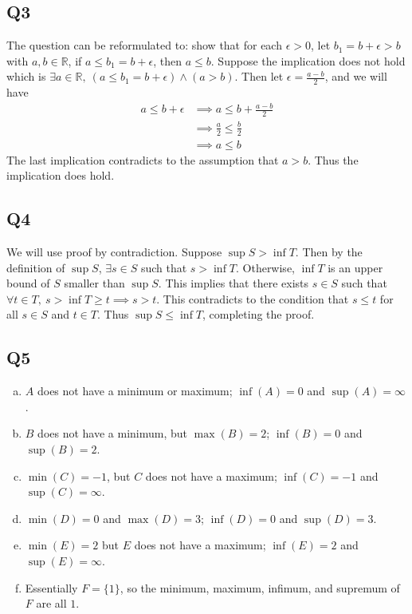 \documentclass[12pt,lettersize]{article}
\newcommand{\R}{\mathbb{R}}
\begin{document}
\subsection*{Q3}

The question can be reformulated to: show that for each $\epsilon>0$, let $b_1=b+\epsilon>b$ with $a,b\in\R$, if $a\leq b_1=b+\epsilon$, then $a\leq b$. Suppose the implication does not hold which is $\exists a\in\R,\ (a\leq b_1=b+\epsilon)\land(a>b)$. Then let $\epsilon=\frac{a-b}{2}$, and we will have
\begin{align*}
	 a\leq b+\epsilon &\implies a\leq b+\frac{a-b}{2}\\
	 				  &\implies \frac{a}{2} \leq \frac{b}{2}\\
	 				  &\implies a\leq b
\end{align*}
The last implication contradicts to the assumption that $a>b$. Thus the implication does hold. 
\newpage

\subsection*{Q4}

We will use proof by contradiction. Suppose $\sup S>\inf T$. Then by the definition of $\sup S$, $\exists s\in S$ such that $s>\inf T$. Otherwise, $\inf T$ is an upper bound of $S$ smaller than $\sup S$. This implies that there exists $s\in S$ such that $\forall t\in T,\ s>\inf T\geq t\implies s>t$. This contradicts to the condition that $s\leq t$ for all $s\in S$ and $t\in T$. Thus $\sup S\leq \inf T$, completing the proof. 

\newpage

\subsection*{Q5}
\begin{enumerate}[(a)]
	\item $A$ does not have a minimum or maximum; $\inf(A)=0$ and $\sup(A)=\infty$.
	\item $B$ does not have a minimum, but $\max(B)=2$; $\inf(B)=0$ and $\sup(B)=2$.
	\item $\min(C)=-1$, but $C$ does not have a maximum; $\inf(C)=-1$ and $\sup(C)=\infty$.
	\item $\min(D)=0$ and $\max(D)=3$; $\inf(D)=0$ and $\sup(D)=3$.
	\item $\min(E)=2$ but $E$ does not have a maximum; $\inf(E)=2$ and $\sup(E)=\infty$.
	\item Essentially $F=\{1\}$, so the minimum, maximum, infimum, and supremum of $F$ are all $1$.
\end{enumerate}
\newpage
\end{document}
